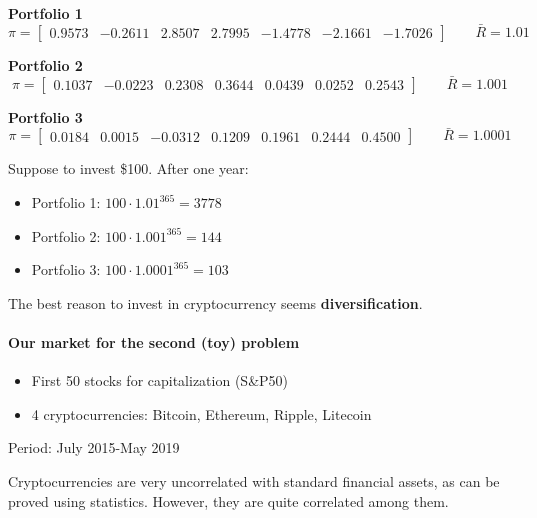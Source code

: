 \textbf{Portfolio 1}
\[
    \pi = \begin{bmatrix}
    0.9573 & -0.2611 & 2.8507 & 2.7995 & -1.4778 & -2.1661 & -1.7026
    \end{bmatrix}
    \qquad
    \bar{R} = 1.01
\]

\textbf{Portfolio 2}
\[
    \pi = \begin{bmatrix}
    0.1037 & -0.0223 & 0.2308 & 0.3644 & 0.0439 & 0.0252 & 0.2543
    \end{bmatrix}
    \qquad
    \bar{R} = 1.001
\]

\textbf{Portfolio 3}
\[
    \pi = \begin{bmatrix}
    0.0184 & 0.0015 & -0.0312 & 0.1209 & 0.1961 & 0.2444 & 0.4500
    \end{bmatrix}
    \qquad
    \bar{R} = 1.0001
\]

Suppose to invest \$100. After one year:
\begin{itemize}
    \item Portfolio 1: $100 \cdot 1.01^{365} = 3778$
    \item Portfolio 2: $100 \cdot 1.001^{365} = 144$
    \item Portfolio 3: $100 \cdot 1.0001^{365} = 103$
\end{itemize}

The best reason to invest in cryptocurrency seems \textbf{diversification}.

\paragraph{Our market for the second (toy) problem}

\begin{itemize}
    \item First 50 stocks for capitalization (S\&P50)
    \item 4 cryptocurrencies: Bitcoin, Ethereum, Ripple, Litecoin
\end{itemize}

Period: July 2015-May 2019


Cryptocurrencies are very uncorrelated with standard financial assets, as can be proved using statistics. However, they are quite correlated among them.



